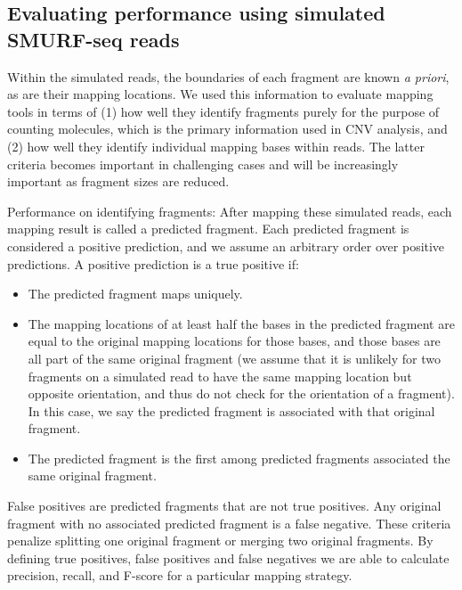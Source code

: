 \subsection{Evaluating performance using simulated SMURF-seq reads}
Within the simulated reads, the boundaries of each fragment are known
\textit{a priori}, as are their mapping locations. We used this
information to evaluate mapping tools in terms of (1) how well they
identify fragments purely for the purpose of counting molecules, which
is the primary information used in CNV analysis, and (2) how well they
identify individual mapping bases within reads. The latter criteria
becomes important in challenging cases and will be increasingly
important as fragment sizes are reduced.

Performance on identifying fragments: After mapping these simulated
reads, each mapping result is called a predicted fragment. Each
predicted fragment is considered a positive prediction, and we assume
an arbitrary order over positive predictions. A positive prediction is
a true positive if:
\begin{itemize}
\item The predicted fragment maps uniquely.
\item The mapping locations of at least half the bases in the
  predicted fragment are equal to the original mapping locations for
  those bases, and those bases are all part of the same original
  fragment (we assume that it is unlikely for two fragments on a simulated
  read to have the same mapping location but opposite orientation, and thus
  do not check for the orientation of a fragment). In this case, we say the
  predicted fragment is associated with that original fragment.
\item The predicted fragment is the first among predicted fragments
  associated the same original fragment.
\end{itemize}
False positives are predicted fragments that are not true positives. Any
original fragment with no associated predicted fragment is a false
negative. These criteria penalize splitting one original fragment or
merging two original fragments. By defining true positives, false
positives and false negatives we are able to calculate precision,
recall, and F-score for a particular mapping strategy.

